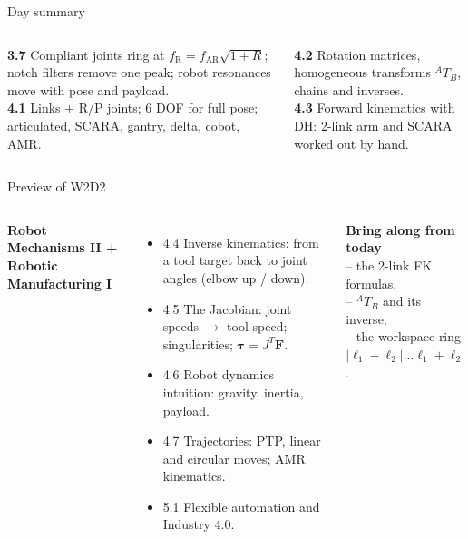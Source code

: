\documentclass[aspectratio=169,10pt]{beamer}
\begin{document}
\begin{frame}[t]{Day summary}
\begin{columns}[T,onlytextwidth]
\begin{defbox}
\small
\textbf{3.7} Compliant joints ring at $f_\text{R}=f_\text{AR}\sqrt{1+R}$; notch filters remove one peak; robot resonances move with pose and payload.\\[1mm]
\textbf{4.1} Links + R/P joints; 6 DOF for full pose; articulated, SCARA, gantry, delta, cobot, AMR.
\end{defbox}
\begin{defbox}
\small
\textbf{4.2} Rotation matrices, homogeneous transforms ${}^AT_B$, chains and inverses.\\[1mm]
\textbf{4.3} Forward kinematics with DH: 2-link arm and SCARA worked out by hand.
\end{defbox}
\end{columns}
\vspace{3mm}
\centering
{}
\end{frame}

\begin{frame}[t]{Preview of W2D2}
\begin{columns}[T,onlytextwidth]
\textbf{Robot Mechanisms II + Robotic Manufacturing I}
\begin{itemize}\small
\item 4.4 Inverse kinematics: from a tool target back to joint angles (elbow up / down).
\item 4.5 The Jacobian: joint speeds $\rightarrow$ tool speed; singularities; $\bm\tau=J^T\bm F$.
\item 4.6 Robot dynamics intuition: gravity, inertia, payload.
\item 4.7 Trajectories: PTP, linear and circular moves; AMR kinematics.
\item 5.1 Flexible automation and Industry 4.0.
\end{itemize}
\begin{notebox}
\textbf{Bring along from today}\\
-- the 2-link FK formulas,\\
-- ${}^AT_B$ and its inverse,\\
-- the workspace ring $|\ell_1-\ell_2|\ldots\ell_1+\ell_2$.
\end{notebox}
\end{columns}
\end{frame}
\end{document}
